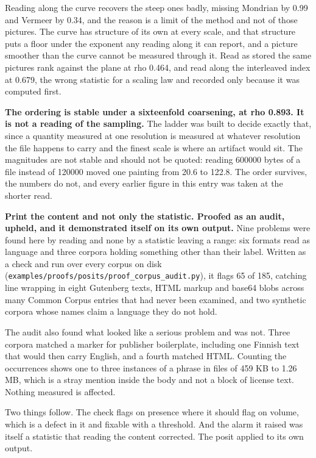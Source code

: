 Reading along the curve recovers the steep ones badly, missing Mondrian by 0.99 and Vermeer by 0.34, and the reason is a limit of the method and not of those pictures. The curve has structure of its own at every scale, and that structure puts a floor under the exponent any reading along it can report, and a picture smoother than the curve cannot be measured through it. Read as stored the same pictures rank against the plane at rho 0.464, and read along the interleaved index at 0.679, the wrong statistic for a scaling law and recorded only because it was computed first.

\textbf{The ordering is stable under a sixteenfold coarsening, at rho 0.893. It is not a reading of the sampling.} The ladder was built to decide exactly that, since a quantity measured at one resolution is measured at whatever resolution the file happens to carry and the finest scale is where an artifact would sit. The magnitudes are not stable and should not be quoted: reading 600000 bytes of a file instead of 120000 moved one painting from 20.6 to 122.8. The order survives, the numbers do not, and every earlier figure in this entry was taken at the shorter read.

\textbf{Print the content and not only the statistic. Proofed as an audit, upheld, and it demonstrated itself on its own output.} Nine problems were found here by reading and none by a statistic leaving a range: six formats read as language and three corpora holding something other than their label. Written as a check and run over every corpus on disk (\texttt{examples/\allowbreak{}proofs/\allowbreak{}posits/\allowbreak{}proof\_\allowbreak{}corpus\_\allowbreak{}audit.\allowbreak{}py}), it flags 65 of 185, catching line wrapping in eight Gutenberg texts, HTML markup and base64 blobs across many Common Corpus entries that had never been examined, and two synthetic corpora whose names claim a language they do not hold.

The audit also found what looked like a serious problem and was not. Three corpora matched a marker for publisher boilerplate, including one Finnish text that would then carry English, and a fourth matched HTML. Counting the occurrences shows one to three instances of a phrase in files of 459 KB to 1.26 MB, which is a stray mention inside the body and not a block of license text. Nothing measured is affected.

Two things follow. The check flags on presence where it should flag on volume, which is a defect in it and fixable with a threshold. And the alarm it raised was itself a statistic that reading the content corrected. The posit applied to its own output.

